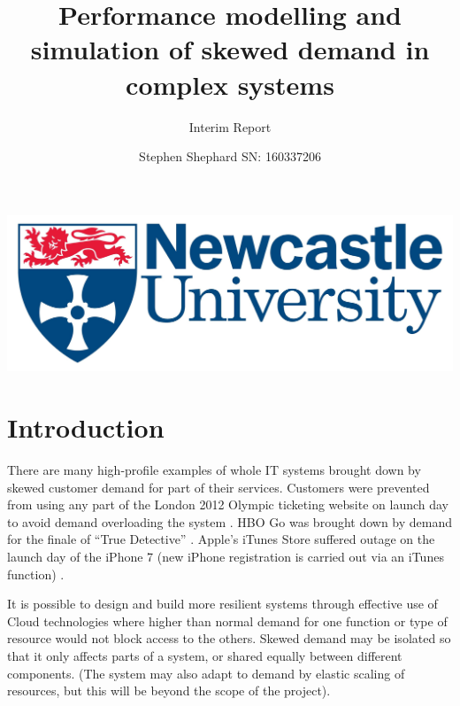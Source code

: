 \documentclass[runningheads]{llncs}
\begin{document}
%
%
	
\title{Performance modelling and simulation of skewed demand in complex systems}
\subtitle{Interim Report}

\author{Stephen Shephard SN: 160337206}


\maketitle

\vspace*{\fill}
\begin{center}
\includegraphics[width=\textwidth]{img/ncllogo}
\end{center}
\newpage

%
%

\section{Introduction}

There are many high-profile examples of whole IT systems brought down by skewed customer demand for part of their services.  Customers were prevented from using any part of the London 2012 Olympic ticketing website on launch day to avoid demand overloading the system \cite{RN1067}.  HBO Go was brought down by demand for the finale of ``True Detective'' \cite{RN1066}.  Apple's iTunes Store suffered outage on the launch day of the iPhone 7 (new iPhone registration is carried out via an iTunes function) \cite{RN1068}.

It is possible to design and build more resilient systems through effective use of Cloud technologies where higher than normal demand for one function or type of resource would not block access to the others.  Skewed demand may be isolated so that it only affects parts of a system, or shared equally between different components. (The system may also adapt to demand by elastic scaling of resources, but this will be beyond the scope of the project).
\end{document}
